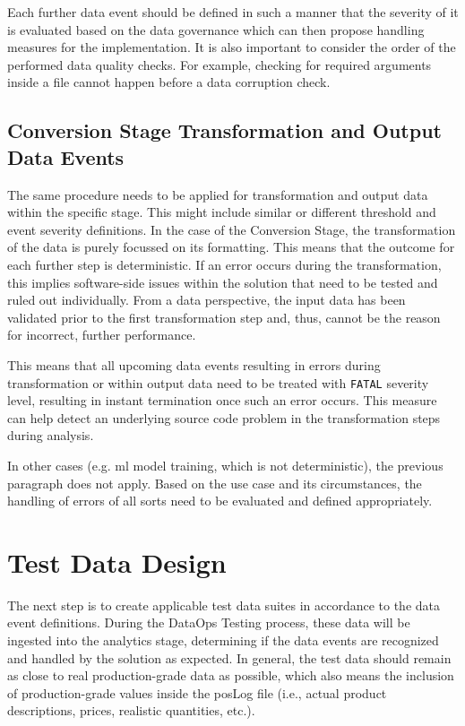 Each further data event should be defined in such a manner that the severity of it is evaluated based on the data governance which can then propose handling measures for the implementation. It is also important to consider the order of the performed data quality checks. For example, checking for required arguments inside a file cannot happen before a data corruption check.

\subsection{Conversion Stage Transformation and Output Data Events}
The same procedure needs to be applied for transformation and output data within the specific stage. This might include similar or different threshold and event severity definitions. In the case of the Conversion Stage, the transformation of the data is purely focussed on its formatting. This means that the outcome for each further step is deterministic. If an error occurs during the transformation, this implies software-side issues within the solution that need to be tested and ruled out individually. From a data perspective, the input data has been validated prior to the first transformation step and, thus, cannot be the reason for incorrect, further performance.

This means that all upcoming data events resulting in errors during transformation or within output data need to be treated with \texttt{FATAL} severity level, resulting in instant termination once such an error occurs. This measure can help detect an underlying source code problem in the transformation steps during analysis.

In other cases (e.g. \acs{ml} model training, which is not deterministic), the previous paragraph does not apply. Based on the use case and its circumstances, the handling of errors of all sorts need to be evaluated and defined appropriately.

\section{Test Data Design} \label{sec:4-test-data-design}
The next step is to create applicable test data suites in accordance to the data event definitions. During the DataOps Testing process, these data will be ingested into the analytics stage, determining if the data events are recognized and handled by the solution as expected. In general, the test data should remain as close to real production-grade data as possible, which also means the inclusion of production-grade values inside the \ac{pos}Log file (i.e., actual product descriptions, prices, realistic quantities, etc.).

